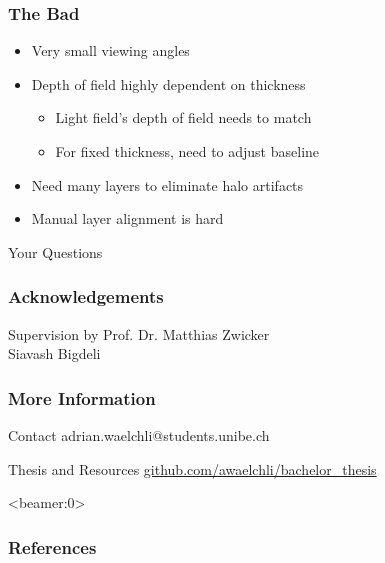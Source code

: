 \documentclass[12pt, compress]{beamer}
\begin{document}
\begin{frame}[fragile]
	\frametitle{The Bad}
	
	\begin{itemize}
		\item \alert<1>{Very small viewing angles}
		\item \alert<2>{Depth of field highly dependent on thickness}
		\begin{itemize}
			\item Light field's depth of field needs to match
			\item For fixed thickness, need to adjust baseline
		\end{itemize}
		\item \alert<3>{Need many layers to eliminate halo artifacts}
		\item \alert<4>{Manual layer alignment is hard}
	\end{itemize}
\end{frame}

\begin{frame}
	\begin{center}
		\LARGE Your Questions
	\end{center}
\end{frame}

\begin{frame}
	\frametitle{Acknowledgements}
	
	\begin{block}{Supervision by}
		Prof. Dr. Matthias Zwicker \\
		Siavash Bigdeli
	\end{block}
\end{frame}

\begin{frame}[fragile]
	\frametitle{More Information}
	
	\begin{block}{Contact}
  		adrian.waelchli@students.unibe.ch
	\end{block}
	
	\begin{block}{Thesis and Resources}
		\href{https://github.com/awaelchli/bachelor_thesis}{github.com/awaelchli/bachelor\_thesis}
	\end{block}
\end{frame}

\begin{frame}<beamer:0>
	\frametitle{References}
	
	
%	
	\def\bibfont{\scriptsize}
	
\end{frame}
\end{document}
